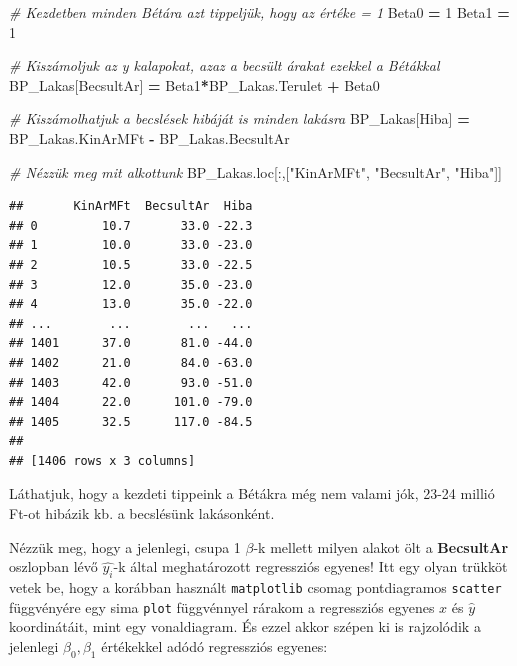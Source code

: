 \documentclass[
]{book}
\newenvironment{Shaded}{\begin{snugshade}}{\end{snugshade}}
\newcommand{\CommentTok}[1]{\textcolor[rgb]{0.56,0.35,0.01}{\textit{#1}}}
\newcommand{\DecValTok}[1]{\textcolor[rgb]{0.00,0.00,0.81}{#1}}
\newcommand{\NormalTok}[1]{#1}
\newcommand{\OperatorTok}[1]{\textcolor[rgb]{0.81,0.36,0.00}{\textbf{#1}}}
\newcommand{\StringTok}[1]{\textcolor[rgb]{0.31,0.60,0.02}{#1}}
\begin{document}
\begin{Shaded}
\begin{Highlighting}[]
\CommentTok{\# Kezdetben minden Bétára azt tippeljük, hogy az értéke = 1}
\NormalTok{Beta0 }\OperatorTok{=} \DecValTok{1}
\NormalTok{Beta1 }\OperatorTok{=} \DecValTok{1}

\CommentTok{\# Kiszámoljuk az y kalapokat, azaz a becsült árakat ezekkel a Bétákkal}
\NormalTok{BP\_Lakas[}\StringTok{\textquotesingle{}BecsultAr\textquotesingle{}}\NormalTok{] }\OperatorTok{=}\NormalTok{ Beta1}\OperatorTok{*}\NormalTok{BP\_Lakas.Terulet }\OperatorTok{+}\NormalTok{ Beta0}

\CommentTok{\# Kiszámolhatjuk a becslések hibáját is minden lakásra}
\NormalTok{BP\_Lakas[}\StringTok{\textquotesingle{}Hiba\textquotesingle{}}\NormalTok{] }\OperatorTok{=}\NormalTok{ BP\_Lakas.KinArMFt }\OperatorTok{{-}}\NormalTok{ BP\_Lakas.BecsultAr}

\CommentTok{\# Nézzük meg mit alkottunk}
\NormalTok{BP\_Lakas.loc[:,[}\StringTok{"KinArMFt"}\NormalTok{, }\StringTok{"BecsultAr"}\NormalTok{, }\StringTok{"Hiba"}\NormalTok{]]}
\end{Highlighting}
\end{Shaded}

\begin{verbatim}
##       KinArMFt  BecsultAr  Hiba
## 0         10.7       33.0 -22.3
## 1         10.0       33.0 -23.0
## 2         10.5       33.0 -22.5
## 3         12.0       35.0 -23.0
## 4         13.0       35.0 -22.0
## ...        ...        ...   ...
## 1401      37.0       81.0 -44.0
## 1402      21.0       84.0 -63.0
## 1403      42.0       93.0 -51.0
## 1404      22.0      101.0 -79.0
## 1405      32.5      117.0 -84.5
## 
## [1406 rows x 3 columns]
\end{verbatim}

Láthatjuk, hogy a kezdeti tippeink a Bétákra még nem valami jók, 23-24 millió Ft-ot hibázik kb. a becslésünk lakásonként.

Nézzük meg, hogy a jelenlegi, csupa 1 \(\beta\)-k mellett milyen alakot ölt a \textbf{BecsultAr} oszlopban lévő \(\hat{y_i}\)-k által meghatározott regressziós egyenes! Itt egy olyan trükköt vetek be, hogy a korábban használt \texttt{matplotlib} csomag pontdiagramos \texttt{scatter} függvényére egy sima \texttt{plot} függvénnyel rárakom a regressziós egyenes \(x\) és \(\hat{y}\) koordinátáit, mint egy vonaldiagram. És ezzel akkor szépen ki is rajzolódik a jelenlegi \(\beta_0,\beta_1\) értékekkel adódó regressziós egyenes:
\end{document}
